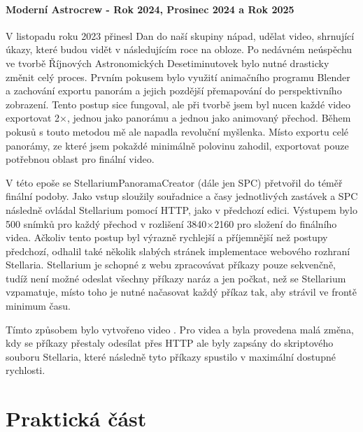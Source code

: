 \documentclass[12pt,a4paper,titlepage]{article}
\begin{document}
\subsection{Moderní Astrocrew - Rok 2024, Prosinec 2024 a Rok 2025}
V listopadu roku 2023 přinesl Dan do naší skupiny nápad, udělat video, shrnující úkazy, které budou vidět v následujícím roce na obloze. Po nedávném neúspěchu ve tvorbě Říjnových Astronomických Desetiminutovek bylo nutné drasticky změnit celý proces. Prvním pokusem bylo využití animačního programu Blender a zachování exportu panorám a jejich pozdější přemapování do perspektivního zobrazení. Tento postup sice fungoval, ale při tvorbě jsem byl nucen každé video exportovat 2×, jednou jako panorámu a jednou jako animovaný přechod. Během pokusů s touto metodou mě ale napadla revoluční myšlenka. Místo exportu celé panorámy, ze které jsem pokaždé minimálně polovinu zahodil, exportovat pouze potřebnou oblast pro finální video. 

V této epoše se StellariumPanoramaCreator (dále jen SPC) přetvořil do téměř finální podoby. Jako vstup sloužily souřadnice a časy jednotlivých zastávek a SPC následně ovládal Stellarium pomocí HTTP, jako v předchozí edici. Výstupem bylo 500 snímků pro každý přechod v rozlišení 3840×2160 pro složení do finálního videa. Ačkoliv tento postup byl výrazně rychlejší a příjemnější než postupy předchozí, odhalil také několik slabých stránek implementace webového rozhraní Stellaria. Stellarium je schopné z webu zpracovávat příkazy pouze sekvenčně, tudíž není možné odeslat všechny příkazy naráz a jen počkat, než se Stellarium vzpamatuje, místo toho je nutné načasovat každý příkaz tak, aby strávil ve frontě minimum času.

Tímto způsobem bylo vytvořeno video . Pro videa  a  byla provedena malá změna, kdy se příkazy přestaly odesílat přes HTTP ale byly zapsány do skriptového souboru Stellaria, které následně tyto příkazy spustilo v maximální dostupné rychlosti.
\newpage
\part{Praktická část}
\newpage
\end{document}
